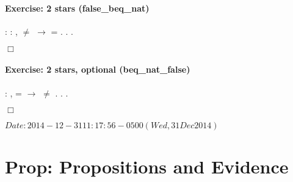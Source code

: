 \documentclass[12pt]{report}
\begin{document}
\subsubsection{ }



\subsubsection{ }



\paragraph{Exercise: 2 stars (false\_beq\_nat)}

\begin{coqdoccode}
\coqdocnoindent
{}  : \coqdockw{\ensuremath{\forall}}   : ,\coqdoceol
\coqdocindent{2.50em}
 \ensuremath{\not=}  \ensuremath{\rightarrow}\coqdoceol
\coqdocindent{2.50em}
   = .\coqdoceol
\coqdocnoindent
{}.\coqdoceol
 .\coqdoceol
\end{coqdoccode}
\ensuremath{\Box} 

\paragraph{Exercise: 2 stars, optional (beq\_nat\_false)}

\begin{coqdoccode}
\coqdocnoindent
{}  : \coqdockw{\ensuremath{\forall}}  ,\coqdoceol
\coqdocindent{1.00em}
   =  \ensuremath{\rightarrow}  \ensuremath{\not=} .\coqdoceol
\coqdocnoindent
{}.\coqdoceol
 .\coqdoceol
\end{coqdoccode}
\ensuremath{\Box} 

 $Date: 2014-12-31 11:17:56 -0500 (Wed, 31 Dec 2014) $ \begin{coqdoccode}
\coqdocemptyline
\end{coqdoccode}

\begin{coqdoccode}
\end{coqdoccode}
\section{Prop: Propositions and Evidence}
\end{document}
